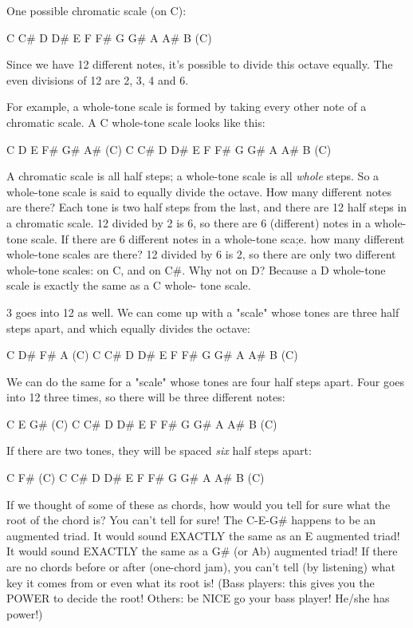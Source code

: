 One possible chromatic scale (on C):

C    C\#   D    D\#   E    F    F\#   G    G\#   A    A\#   B    (C)

Since we have 12 different notes, it's possible to divide this octave equally.
The even divisions of 12 are 2, 3, 4 and 6.

For example, a whole-tone scale is formed by taking every other note of a
chromatic scale. A C whole-tone scale looks like this:

C         D         E         F\#        G\#        A\#        (C)
C    C\#   D    D\#   E    F    F\#   G    G\#   A    A\#   B    (C)

A chromatic scale is all half steps; a whole-tone scale is all \emph{whole} steps.
So a whole-tone scale is said to equally divide the octave. How many different
notes are there? Each tone is two half steps from the last, and there are 12
half steps in a chromatic scale. 12 divided by 2 is 6, so there are 6
(different) notes in a whole-tone scale. If there are 6 different notes in
a whole-tone sca;e. how many different whole-tone scales are there? 12 divided
by 6 is 2, so there are only two different whole-tone scales: on C, and on C\#.
Why not on D? Because a D whole-tone scale is exactly the same as a C whole-
tone scale.

3 goes into 12 as well. We can come up with a "scale" whose tones are three
half steps apart, and which equally divides the octave:

C              D\#             F\#             A              (C)
C    C\#   D    D\#   E    F    F\#   G    G\#   A    A\#   B    (C)

We can do the same for a "scale" whose tones are four half steps apart. Four
goes into 12 three times, so there will be three different notes:

C                   E                   G\#                  (C)
C    C\#   D    D\#   E    F    F\#   G    G\#   A    A\#   B    (C)

If there are two tones, they will be spaced \emph{six} half steps apart:

C                             F\#                            (C)
C    C\#   D    D\#   E    F    F\#   G    G\#   A    A\#   B    (C)

If we thought of some of these as chords, how would you tell for sure what the
root of the chord is? You can't tell for sure! The C-E-G\# happens to be an
augmented triad. It would sound EXACTLY the same as an E augmented triad! It
would sound EXACTLY the same as a G\# (or Ab) augmented triad! If there are no
chords before or after (one-chord jam), you can't tell (by listening) what key
it comes from or even what its root is! (Bass players: this gives you the POWER
to decide the root! Others: be NICE go your bass player! He/she has power!)

